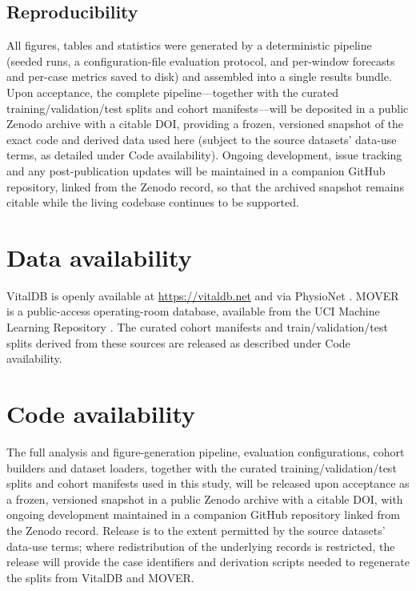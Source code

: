 \documentclass[11pt]{article}
\begin{document}
\subsection{Reproducibility}

All figures, tables and statistics were generated by a deterministic pipeline
(seeded runs, a configuration-file evaluation protocol, and per-window
forecasts and per-case metrics saved to disk) and assembled into a single
results bundle. Upon acceptance, the complete pipeline---together with the
curated training/validation/test splits and cohort manifests---will be
deposited in a public Zenodo archive with a citable DOI, providing a frozen,
versioned snapshot of the exact code and derived data used here (subject to
the source datasets' data-use terms, as detailed under Code availability).
Ongoing development, issue tracking and any post-publication updates will be
maintained in a companion GitHub repository, linked from the Zenodo record,
so that the archived snapshot remains citable while the living codebase
continues to be supported.

\section*{Data availability}
VitalDB is openly available at \url{https://vitaldb.net} and via PhysioNet
\citep{VitalDBPhysioNet2022}. MOVER is a public-access operating-room
database, available from the UCI Machine Learning Repository
\citep{Samad2023,MOVERUCI2023}. The curated cohort manifests and
train/validation/test splits derived from these sources are released as
described under Code availability.

\section*{Code availability}
The full analysis and figure-generation pipeline, evaluation configurations,
cohort builders and dataset loaders, together with the curated
training/validation/test splits and cohort manifests used in this study,
will be released upon acceptance as a frozen, versioned snapshot in a public
Zenodo archive with a citable DOI, with ongoing development maintained in a
companion GitHub repository linked from the Zenodo record. Release is to the
extent permitted by the source datasets' data-use terms; where redistribution
of the underlying records is restricted, the release will provide the case
identifiers and derivation scripts needed to regenerate
the splits from VitalDB and MOVER.
\end{document}

